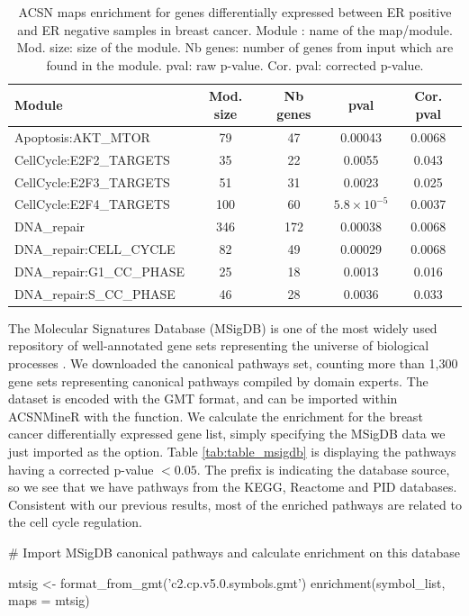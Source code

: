 \begin{table}[h!]
  \centering
  \caption{ACSN maps enrichment for genes differentially expressed between ER
positive and ER negative samples in breast cancer.  Module : name of the
map/module. Mod. size: size of the module. Nb genes: number of genes from input
which are found in the module. pval: raw p-value. Cor. pval: corrected p-value.}
\label{tab:table_mainz}

\begin{tabular}{l c c c c}
\toprule
Module & Mod. size & Nb genes & pval & Cor. pval\\
\midrule
  Apoptosis:AKT\_MTOR & 79 & 47 & 0.00043 & 0.0068 \\ 
  CellCycle:E2F2\_TARGETS & 35 & 22 & 0.0055 & 0.043 \\ 
  CellCycle:E2F3\_TARGETS & 51 & 31 & 0.0023 & 0.025 \\ 
  CellCycle:E2F4\_TARGETS & 100 & 60 & $5.8 \times 10^{-5}$ & 0.0037 \\ 
  DNA\_repair & 346 & 172 & 0.00038 & 0.0068 \\ 
  DNA\_repair:CELL\_CYCLE & 82 & 49 & 0.00029 & 0.0068 \\ 
  DNA\_repair:G1\_CC\_PHASE & 25 & 18 & 0.0013 & 0.016 \\ 
  DNA\_repair:S\_CC\_PHASE & 46 & 28 & 0.0036 & 0.033 \\ 
\bottomrule
\end{tabular}
\end{table}

The Molecular Signatures Database (MSigDB) is one of the most widely used
repository of well-annotated  gene sets representing the universe of biological
processes \citep{liberzon2011molecular}. We downloaded the canonical pathways
set, counting more than 1,300 gene sets representing canonical pathways compiled
by domain experts. The dataset is encoded with the GMT format, and can be
imported within ACSNMineR with the  function. We
calculate the enrichment for the breast cancer differentially expressed gene
list, simply specifying the MSigDB data we just imported as the 
option. Table \ref{tab:table_msigdb} is displaying the pathways having a
corrected p-value $< 0.05$. The prefix is indicating the database source, so we
see that we have pathways from the KEGG, Reactome and PID databases. Consistent
with our previous results, most of the enriched pathways are related to the cell
cycle regulation. 


\begin{example}
# Import MSigDB canonical pathways and calculate enrichment on this database 

mtsig <- format_from_gmt('c2.cp.v5.0.symbols.gmt')
enrichment(symbol_list, maps = mtsig)

\end{example}


